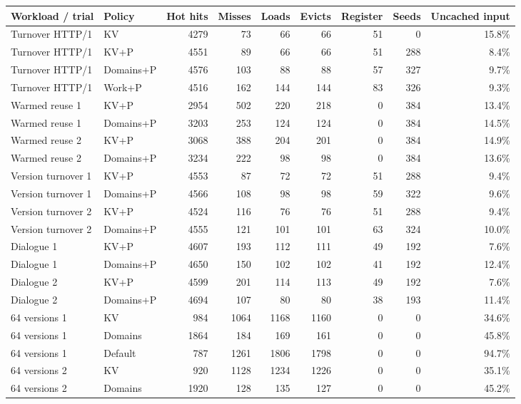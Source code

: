 \begin{table}[t]\centering\small
\begin{tabular}{llrrrrrrr}\toprule
Workload / trial & Policy & Hot hits & Misses & Loads & Evicts & Register & Seeds & Uncached input\\\midrule
Turnover HTTP/1 & KV & 4279 & 73 & 66 & 66 & 51 & 0 & 15.8\% \\
Turnover HTTP/1 & KV+P & 4551 & 89 & 66 & 66 & 51 & 288 & 8.4\% \\
Turnover HTTP/1 & Domains+P & 4576 & 103 & 88 & 88 & 57 & 327 & 9.7\% \\
Turnover HTTP/1 & Work+P & 4516 & 162 & 144 & 144 & 83 & 326 & 9.3\% \\
Warmed reuse 1 & KV+P & 2954 & 502 & 220 & 218 & 0 & 384 & 13.4\% \\
Warmed reuse 1 & Domains+P & 3203 & 253 & 124 & 124 & 0 & 384 & 14.5\% \\
Warmed reuse 2 & KV+P & 3068 & 388 & 204 & 201 & 0 & 384 & 14.9\% \\
Warmed reuse 2 & Domains+P & 3234 & 222 & 98 & 98 & 0 & 384 & 13.6\% \\
Version turnover 1 & KV+P & 4553 & 87 & 72 & 72 & 51 & 288 & 9.4\% \\
Version turnover 1 & Domains+P & 4566 & 108 & 98 & 98 & 59 & 322 & 9.6\% \\
Version turnover 2 & KV+P & 4524 & 116 & 76 & 76 & 51 & 288 & 9.4\% \\
Version turnover 2 & Domains+P & 4555 & 121 & 101 & 101 & 63 & 324 & 10.0\% \\
Dialogue 1 & KV+P & 4607 & 193 & 112 & 111 & 49 & 192 & 7.6\% \\
Dialogue 1 & Domains+P & 4650 & 150 & 102 & 102 & 41 & 192 & 12.4\% \\
Dialogue 2 & KV+P & 4599 & 201 & 114 & 113 & 49 & 192 & 7.6\% \\
Dialogue 2 & Domains+P & 4694 & 107 & 80 & 80 & 38 & 193 & 11.4\% \\
64 versions 1 & KV & 984 & 1064 & 1168 & 1160 & 0 & 0 & 34.6\% \\
64 versions 1 & Domains & 1864 & 184 & 169 & 161 & 0 & 0 & 45.8\% \\
64 versions 1 & Default & 787 & 1261 & 1806 & 1798 & 0 & 0 & 94.7\% \\
64 versions 2 & KV & 920 & 1128 & 1234 & 1226 & 0 & 0 & 35.1\% \\
64 versions 2 & Domains & 1920 & 128 & 135 & 127 & 0 & 0 & 45.2\% \\

\end{tabular}
\end{table}
